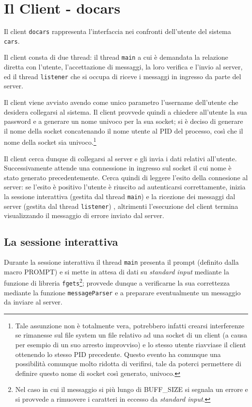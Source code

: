 \documentclass[a4paper,10pt]{article}
\begin{document}
\section{Il Client - docars}

Il client \texttt{docars} rappresenta l'interfaccia nei confronti dell'utente del sistema \texttt{cars}.

Il client consta di due thread: il thread \texttt{main} a cui \`e demandata la relazione diretta con l'utente, l'accettazione di messaggi, la loro verifica e l'invio al server, ed il thread \texttt{listener} che si occupa di riceve i messaggi in ingresso da parte del server.

Il client viene avviato avendo come unico parametro l'username dell'utente che desidera collegarsi al sistema. Il client provvede quindi a chiedere all'utente la sua password e a generare un nome univoco per la sua socket; si \`e deciso di generare il nome della socket concatenando il nome utente al PID del processo, cos\`i che il nome della socket sia univoco.\footnote{Tale assunzione non \`e totalmente vera, potrebbero infatti crearsi interferenze se rimanesse sul file system un file relativo ad una socket di un client (a causa per esempio di un suo arresto improvviso) e lo stesso utente riavviase il client ottenendo lo stesso PID precedente. Questo evento ha comunque una possibilit\`a comunque molto ridotta di verifirsi, tale da poterci permettere di definire questo nome di socket cos\`i generato, univoco.}

Il client cerca dunque di collegarsi al server e gli invia i dati relativi all'utente. Successivamente attende una connessione in ingresso sul socket il cui nome \`e stato generato precedentemente. Cerca quindi di leggere l'esito della connesione al server: se l'esito \`e positivo l'utente \`e riuscito ad autenticarsi correttamente, inizia la sessione interattiva (gestita dal thread \texttt{main}) e la ricezione dei messaggi dal server (gestita dal thread \texttt{listener}) , altrimenti l'esecuzione del client termina visualizzando il messaggio di errore inviato dal server.

\subsection{La sessione interattiva}

Durante la sessione interattiva il thread \texttt{main} presenta il prompt (definito dalla macro PROMPT) e si mette in attesa di dati su \textit{standard input} mediante la funzione di libreria \texttt{fgets}\footnote{Nel caso in cui il messaggio si pi\`u lungo di BUFF\_SIZE si segnala un errore e si provvede a rimuovere i caratteri in eccesso da \textit{standard input}.}; provvede dunque a verificarne la sua correttezza mediante la funzione \texttt{messageParser} e a preparare eventualmente un messaggio da inviare al server.
\end{document}
